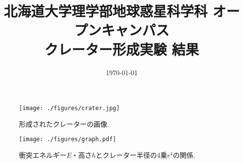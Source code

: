 \documentclass[a4paper]{ltjsarticle}
\begin{document}
\title{北海道大学理学部地球惑星科学科 オープンキャンパス\\クレーター形成実験 結果}
\date{\today}
\maketitle
\thispagestyle{empty}
\begin{figure}[H]
    \centering
    \texttt{[image: ./figures/crater.jpg]}
    \caption{形成されたクレーターの画像.}
\end{figure}
\begin{figure}[H]
    \centering
    \texttt{[image: ./figures/graph.pdf]}
    \caption{衝突エネルギー$E$・高さ$h$とクレーター半径の4乗$r^4$の関係.}
\end{figure}
\end{document}
